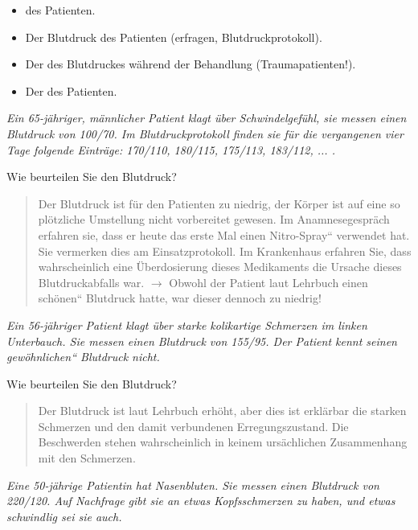\begin{itemize}
    \item {} des Patienten.
    \item Der  Blutdruck des Patienten
    (erfragen, Blutdruckprotokoll).
    \item Der  des Blutdruckes während der
    Behandlung (Traumapatienten!).
    \item Der  des Patienten.
\end{itemize}


\emph{Ein 65-jähriger, männlicher Patient klagt über
Schwindelgefühl, sie messen einen Blutdruck von 100/70. Im Blutdruckprotokoll finden sie
für die vergangenen vier Tage folgende Einträge: 170/110, 180/115,
175/113, 183/112, ... .}


Wie beurteilen Sie den Blutdruck?

\begin{quote}
Der Blutdruck ist für den Patienten zu niedrig, der Körper ist auf
eine so plötzliche Umstellung nicht vorbereitet gewesen. Im
Anamnesegespräch erfahren sie, dass er heute das erste Mal einen
{\quotedblbase}Nitro-Spray{\textquotedblleft} verwendet hat. Sie
vermerken dies am Einsatzprotokoll. Im Krankenhaus erfahren Sie, dass
wahrscheinlich eine Überdosierung dieses Medikaments die Ursache
dieses Blutdruckabfalls war. ${\rightarrow}$ Obwohl der Patient laut
Lehrbuch einen {\quotedblbase}schönen{\textquotedblleft} Blutdruck
hatte, war dieser dennoch zu niedrig!
\end{quote}

\emph{Ein 56-jähriger Patient klagt über starke
kolikartige Schmerzen im linken Unterbauch. Sie messen einen Blutdruck von 155/95. Der Patient
kennt seinen {\quotedblbase}gewöhnlichen{\textquotedblleft} Blutdruck
nicht.}  

Wie beurteilen Sie den Blutdruck? 

\begin{quote}
Der Blutdruck ist laut Lehrbuch erhöht, aber dies ist erklärbar die
starken Schmerzen und den damit verbundenen Erregungszustand. Die
Beschwerden stehen wahrscheinlich in keinem ursächlichen Zusammenhang
mit den Schmerzen. 
\end{quote}

\emph{Eine 50-jährige Patientin hat Nasenbluten. Sie
messen einen Blutdruck von 220/120. Auf Nachfrage gibt sie an etwas Kopfsschmerzen zu haben,
und etwas schwindlig sei sie auch.} 

